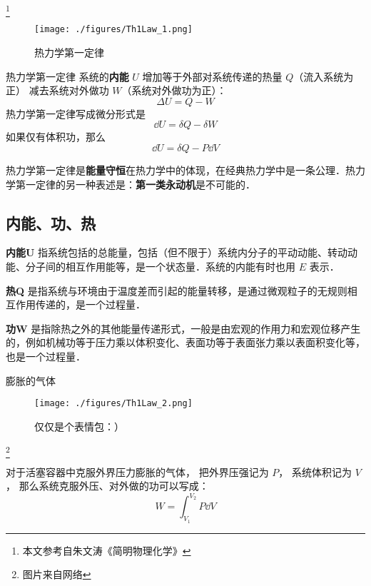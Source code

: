 
\begin{issues}
\issueDraft
\end{issues}

\footnote{本文参考自朱文涛《简明物理化学》}

\begin{figure}[ht]
\centering
\texttt{[image: ./figures/Th1Law\_1.png]}
\caption{热力学第一定律} \label{Th1Law_fig1}
\end{figure}

\begin{theorem}{热力学第一定律}
系统的\textbf{内能} $U$ 增加等于外部对系统传递的热量 $Q$（流入系统为正） 减去系统对外做功 $W$（系统对外做功为正）：
\begin{equation}\label{Th1Law_eq1}
\Delta U = Q - W
\end{equation}
热力学第一定律写成微分形式是
\begin{equation} \label{Th1Law_eq2}
\dd U = \delta Q - \delta W
\end{equation}
如果仅有体积功，那么
\begin{equation}
\dd U = \delta Q - P \dd V
\end{equation}
\end{theorem}

热力学第一定律是\textbf{能量守恒}在热力学中的体现，在经典热力学中是一条公理．热力学第一定律的另一种表述是：\textbf{第一类永动机}是不可能的．

\subsection{内能、功、热}
\textbf{内能U} 指系统包括的总能量，包括（但不限于）系统内分子的平动动能、转动动能、分子间的相互作用能等，是一个状态量．系统的内能有时也用 $E$ 表示． 

\textbf{热Q} 是指系统与环境由于温度差而引起的能量转移，是通过微观粒子的无规则相互作用传递的，是一个过程量．

\textbf{功W} 是指除热之外的其他能量传递形式，一般是由宏观的作用力和宏观位移产生的，例如机械功等于压力乘以体积变化、表面功等于表面张力乘以表面积变化等，也是一个过程量．

\begin{example}{膨胀的气体}
\begin{figure}[ht]
\centering
\texttt{[image: ./figures/Th1Law\_2.png]}
\caption{仅仅是个表情包：）} \label{Th1Law_fig2}
\end{figure}
\footnote{图片来自网络}

对于活塞容器中克服外界压力膨胀的气体， 把外界压强记为 $P$， 系统体积记为 $V$， 那么系统克服外压、对外做的功可以写成：
\begin{equation}
W = \int_{V_1}^{V_2} P \dd{V}
\end{equation}
\end{example}

